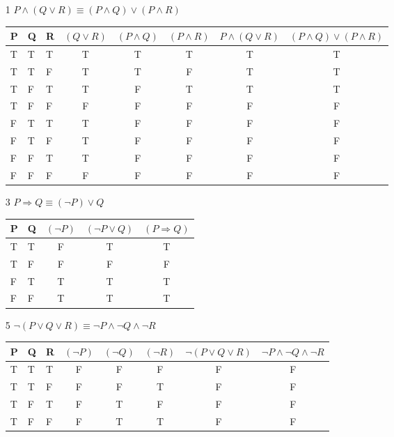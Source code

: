 \documentclass[12pt]{article}
\begin{document}
\begin{enumerate}
    \item [1] $P \land (Q \lor R) \equiv (P\land Q) \lor (P\land R)$\\
	    \begin{tabular}{l|l|l|c|c|c|c|c}
		\hline
		P & Q & R & $(Q \lor R)$ & $(P \land  Q)$ & $(P \land R)$ & $P \land (Q \lor R)$ & $(P\land Q) \lor (P\land R)$\\
		\hline
		T & T & T & T       & T    & T    & T & T \\
		T & T & F & T       & T    & F    & T & T \\
		T & F & T & T       & F    & T    & T & T \\
		T & F & F & F       & F    & F    & F & F \\
		F & T & T & T       & F    & F    & F & F \\
		F & T & F & T       & F    & F    & F & F \\
		F & F & T & T       & F    & F    & F & F \\
		F & F & F & F       & F    & F    & F & F \\
		\hline
	    \end{tabular}
    \item [3] $P\Rightarrow Q \equiv (\neg P) \lor Q$\\
	    \begin{tabular}{l|l|c|c|c}
		\hline
		P & Q & $(\neg P)$ & $(\neg P \lor Q)$ & $(P\Rightarrow Q)$\\
		\hline
		T & T & F     & T         & T \\
		T & F & F     & F         & F \\
		F & T & T     & T         & T \\
		F & F & T     & T         & T \\
		\hline
	    \end{tabular}
    \item [5] $\neg (P \lor Q \lor R) \equiv \neg P \land \neg Q \land \neg R$\\
	    \begin{tabular}{l|l|l|c|c|c|c|c}
		\hline
		P & Q & R & $(\neg P)$ & $(\neg Q)$ & $(\neg R)$ & $\neg(P \lor Q \lor R)$ & $\neg P \land \neg Q \land \neg R$\\
		\hline
		T & T & T & F & F      & F    & F & F \\
		T & T & F & F   & F    & T    & F & F \\
		T & F & T & F   & T    & F    & F & F \\
		T & F & F & F   & T    & T    & F & F \\

\end{tabular}
\end{enumerate}
\end{document}

